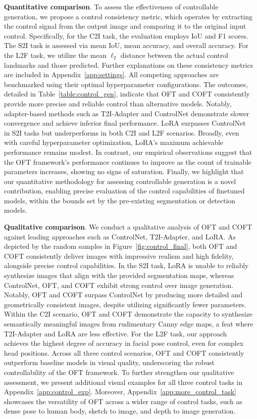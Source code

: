 \textbf{Quantitative comparison}. To assess the effectiveness of controllable generation, we propose a control consistency metric, which operates by extracting the control signal from the output image and comparing it to the original input control. Specifically, for the C2I task, the evaluation employs IoU and F1 scores. The S2I task is assessed via mean IoU, mean accuracy, and overall accuracy. For the L2F task, we utilize the mean $\ell_2$ distance between the actual control landmarks and those predicted. Further explanations on these consistency metrics are included in Appendix~\ref{app:settings}. All competing approaches are benchmarked using their optimal hyperparameter configurations. The outcomes, detailed in Table~\ref{table:control_gen}, indicate that OFT and COFT consistently provide more precise and reliable control than alternative models. Notably, adapter-based methods such as T2I-Adapter and ControlNet demonstrate slower convergence and achieve inferior final performance. LoRA surpasses ControlNet in S2I tasks but underperforms in both C2I and L2F scenarios. Broadly, even with careful hyperparameter optimization, LoRA’s maximum achievable performance remains modest. In contrast, our empirical observations suggest that the OFT framework’s performance continues to improve as the count of trainable parameters increases, showing no signs of saturation. Finally, we highlight that our quantitative methodology for assessing controllable generation is a novel contribution, enabling precise evaluation of the control capabilities of finetuned models, within the bounds set by the pre-existing segmentation or detection models.

\textbf{Qualitative comparison}. We conduct a qualitative analysis of OFT and COFT against leading approaches such as ControlNet, T2I-Adapter, and LoRA. As depicted by the random samples in Figure~\ref{fig:control_final}, both OFT and COFT consistently deliver images with impressive realism and high fidelity, alongside precise control capabilities. In the S2I task, LoRA is unable to reliably synthesize images that align with the provided segmentation maps, whereas ControlNet, OFT, and COFT exhibit strong control over image generation. Notably, OFT and COFT surpass ControlNet by producing more detailed and geometrically consistent images, despite utilizing significantly fewer parameters. Within the C2I scenario, OFT and COFT demonstrate the capacity to synthesize semantically meaningful images from rudimentary Canny edge maps, a feat where T2I-Adapter and LoRA are less effective. For the L2F task, our approach achieves the highest degree of accuracy in facial pose control, even for complex head positions. Across all three control scenarios, OFT and COFT consistently outperform baseline models in visual quality, underscoring the robust controllability of the OFT framework. To further strengthen our qualitative assessment, we present additional visual examples for all three control tasks in Appendix~\ref{app:control_exp}. Moreover, Appendix~\ref{app:more_control_task} showcases the versatility of OFT across a wider range of control tasks, such as dense pose to human body, sketch to image, and depth to image generation.

